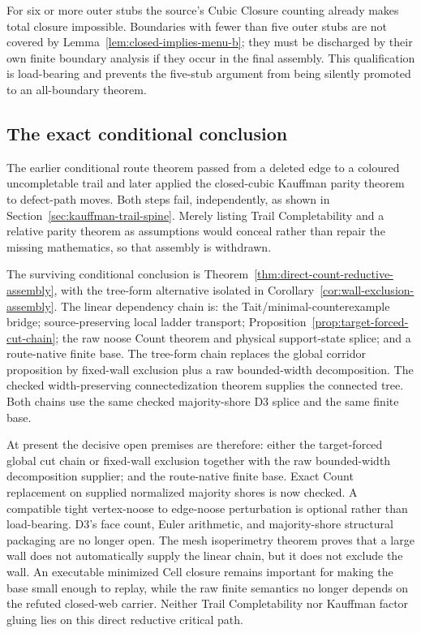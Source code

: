 For six or more outer stubs the source's Cubic Closure counting already makes
total closure impossible.  Boundaries with fewer than five outer stubs are
not covered by Lemma~\ref{lem:closed-implies-menu-b}; they must be discharged
by their own finite boundary analysis if they occur in the final assembly.
This qualification is load-bearing and prevents the five-stub argument from
being silently promoted to an all-boundary theorem.

\subsection{The exact conditional conclusion}

\begin{remark}
\label{thm:conditional-compositional-route}
The earlier conditional route theorem passed from a deleted edge to a
coloured uncompletable trail and later applied the closed-cubic Kauffman
parity theorem to defect-path moves.  Both steps fail, independently, as
shown in Section~\ref{sec:kauffman-trail-spine}.  Merely listing Trail
Completability and a relative parity theorem as assumptions would conceal
rather than repair the missing mathematics, so that assembly is withdrawn.
\end{remark}

The surviving conditional conclusion is
Theorem~\ref{thm:direct-count-reductive-assembly}, with the tree-form
alternative isolated in Corollary~\ref{cor:wall-exclusion-assembly}.  The
linear dependency chain is: the Tait/minimal-counterexample bridge;
source-preserving local ladder transport;
Proposition~\ref{prop:target-forced-cut-chain}; the raw noose Count theorem
and physical support-state splice; and a route-native finite base.  The
tree-form chain replaces the global corridor proposition by fixed-wall
exclusion plus a raw bounded-width decomposition.  The checked
width-preserving connectedization theorem supplies the connected tree.  Both chains
use the same checked majority-shore D3 splice and the
same finite base.

At present the decisive open premises are therefore: either the
target-forced global cut chain or fixed-wall exclusion together with the raw
bounded-width decomposition supplier; and the route-native finite base.
Exact Count replacement on supplied normalized majority shores is now
checked.  A compatible tight vertex-noose to edge-noose
perturbation is optional rather than load-bearing.  D3's face count, Euler
arithmetic, and majority-shore structural packaging are no longer open.  The mesh
isoperimetry theorem proves that a large wall does not automatically supply
the linear chain, but it does not exclude the wall.  An executable minimized
Cell closure remains important for making the base small enough to replay,
while the raw finite semantics no longer depends on the refuted closed-web
carrier.  Neither Trail Completability nor Kauffman factor gluing lies on
this direct reductive critical path.

